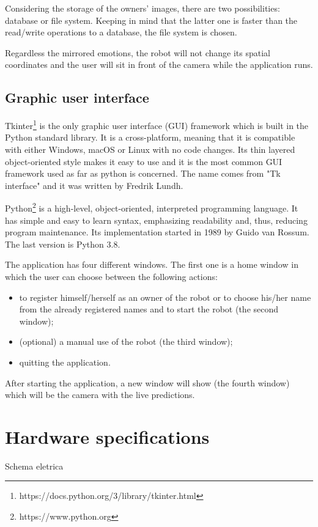\documentclass[runningheads,a4paper,12pt]{report}
\begin{document}
Considering the storage of the owners' images, there are two possibilities: database or file system. Keeping in mind that the latter one is faster than the read/write operations to a database, the file system is chosen. 

Regardless the mirrored emotions, the robot will not change its spatial coordinates and the user will sit in front of the camera while the application runs. 

\subsection{Graphic user interface}
Tkinter\footnote{https://docs.python.org/3/library/tkinter.html} is the only graphic user interface (GUI) framework which is built in the Python standard library. It is a cross-platform, meaning that it is compatible with either Windows, macOS or Linux with no code changes. Its thin layered object-oriented style makes it easy to use and it is the most common GUI framework used as far as python is concerned. The name comes from "Tk interface" and it was written by Fredrik Lundh.  

Python\footnote{https://www.python.org} is a high-level, object-oriented, interpreted programming language. It has simple and easy to learn syntax, emphasizing readability and, thus, reducing program maintenance. Its implementation started in 1989 by Guido van Rossum. The last version is Python 3.8.

The application has four different windows. The first one is a home window in which the user can choose between the following actions:

\begin{itemize}

\item to register himself/herself as an owner of the robot or to choose his/her name from the already registered names and to start the robot (the second window);

\item (optional) a manual use of the robot (the third window);

\item quitting the application.
\end{itemize}

After starting the application, a new window will show (the fourth window) which will be the camera with the live predictions.


\section{Hardware specifications}
Schema eletrica
\end{document}

